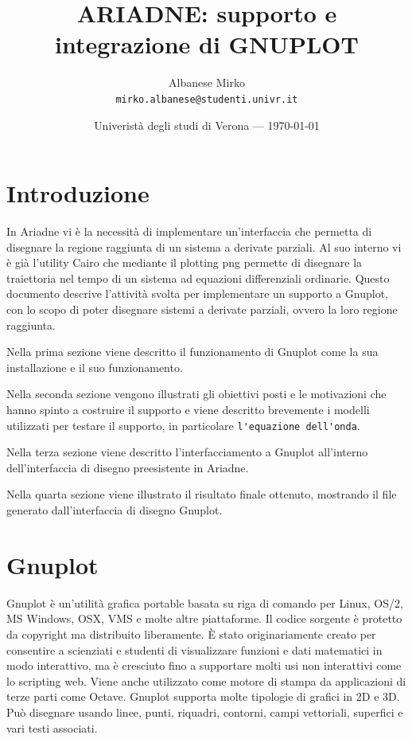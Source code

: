 \documentclass{article}
\title{ARIADNE: supporto e integrazione di GNUPLOT} %
\author{Albanese Mirko\\ \texttt{mirko.albanese@studenti.univr.it}} %
\date{Univeristà degli studi di Verona --- \today} %
\begin{document}
\maketitle %


\section*{Introduzione} %
In Ariadne vi è la necessità di implementare un'interfaccia che permetta di disegnare la regione raggiunta di un sistema a derivate parziali. Al suo interno vi è già l'utility Cairo che mediante il plotting png permette di disegnare la traiettoria nel tempo di un sistema ad equazioni differenziali ordinarie. Questo documento descrive l'attività svolta per implementare un supporto a Gnuplot, con lo scopo di poter disegnare sistemi a derivate parziali, ovvero la loro regione raggiunta.

Nella prima sezione viene descritto il funzionamento di Gnuplot come la sua installazione e il suo funzionamento.

Nella seconda sezione vengono illustrati gli obiettivi posti e le motivazioni che hanno spinto a costruire il supporto e viene descritto brevemente i modelli utilizzati per testare il supporto, in particolare \verb|l'equazione dell'onda|.

Nella terza sezione viene descritto l'interfacciamento a Gnuplot all'interno dell'interfaccia di disegno preesistente in Ariadne.

Nella quarta sezione viene illustrato il risultato finale ottenuto, mostrando il file generato dall'interfaccia di disegno Gnuplot.



\section{Gnuplot}

Gnuplot è un'utilità grafica portable basata su riga di comando per Linux, OS/2, MS Windows, OSX, VMS e molte altre piattaforme. Il codice sorgente è protetto da copyright ma distribuito liberamente. È stato originariamente creato per consentire a scienziati e studenti di visualizzare funzioni e dati matematici in modo interattivo, ma è cresciuto fino a supportare molti usi non interattivi come lo scripting web. Viene anche utilizzato come motore di stampa da applicazioni di terze parti come Octave. 
Gnuplot supporta molte tipologie di grafici in 2D e 3D. Può disegnare usando linee, punti, riquadri, contorni,
campi vettoriali, superfici e vari testi associati.
\end{document}
